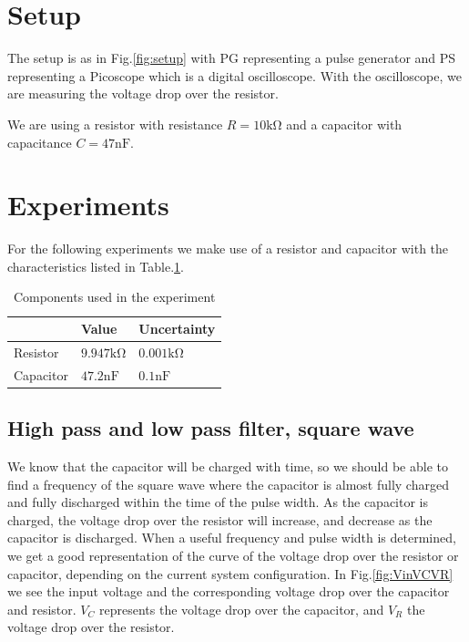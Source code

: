 \documentclass[../main/main.tex]{subfiles}
\begin{document}
\section*{Setup}

The setup is as in Fig.\ref{fig:setup} with PG representing a pulse generator and PS representing a Picoscope which is a digital oscilloscope.
With the oscilloscope, we are measuring the voltage drop over the resistor.

We are using a resistor with resistance \( R = 10 \si{\kilo\ohm} \) and a capacitor with capacitance \( C = 47 \si{\nano\farad} \).

\section{Experiments}

For the following experiments we make use of a resistor and capacitor with the characteristics listed in Table.\ref{components}.

\begin{table}[]
\centering
\caption{Components used in the experiment}
\label{components}
\begin{tabular}{|l|l|l|}
\hline
          & Value                         & Uncertainty                  \\ \hline
Resistor  & \( 9.947 \si{\kilo\ohm} \)  & \( 0.001 \si{\kilo\ohm} \) \\ \hline
Capacitor & \( 47.2 \si{\nano\farad} \) & \( 0.1 \si{\nano\farad} \) \\ \hline
\end{tabular}
\end{table}

\subsection*{High pass and low pass filter, square wave}

We know that the capacitor will be charged with time, so we should be able to find a frequency of the square wave where the capacitor is almost fully charged and fully discharged within the time of the pulse width.
As the capacitor is charged, the voltage drop over the resistor will increase, and decrease as the capacitor is discharged.
When a useful frequency and pulse width is determined, we get a good representation of the curve of the voltage drop over the resistor or capacitor, depending on the current system configuration.
In Fig.\ref{fig:VinVCVR} we see the input voltage and the corresponding voltage drop over the capacitor and resistor.
\( V_C \) represents the voltage drop over the capacitor, and \( V_R \) the voltage drop over the resistor.
\end{document}
